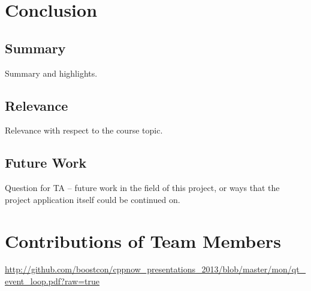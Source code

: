 \documentclass[12pt]{article}
\begin{document}
	\section{Conclusion}
	
	\subsection{Summary}
	Summary and highlights.
	
	\subsection{Relevance}
	Relevance with respect to the course topic.
	
	\subsection{Future Work}
	Question for TA -- future work in the field of this project, or ways that the project application itself could be continued on.
	
	
	\setcounter{secnumdepth}{0}
	\section{Contributions of Team Members}
	
	\begin{thebibliography}{3}
	 \url{http://github.com/boostcon/cppnow_presentations_2013/blob/master/mon/qt_event_loop.pdf?raw=true}
	\end{thebibliography}{}
\end{document}
